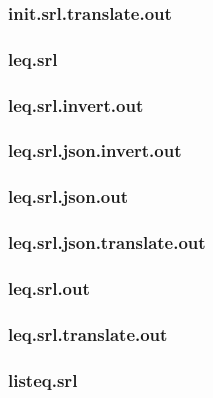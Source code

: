 \subsubsection{init.srl.translate.out}
\label{app:init_srl.translate.out}

\subsubsection{leq.srl}
\label{app:leq_srl}

\subsubsection{leq.srl.invert.out}
\label{app:leq_srl.invert.out}

\subsubsection{leq.srl.json.invert.out}
\label{app:leq_srl.json.invert.out}

\subsubsection{leq.srl.json.out}
\label{app:leq_srl.json.out}

\subsubsection{leq.srl.json.translate.out}
\label{app:leq_srl.json.translate.out}

\subsubsection{leq.srl.out}
\label{app:leq_srl.out}

\subsubsection{leq.srl.translate.out}
\label{app:leq_srl.translate.out}

\subsubsection{listeq.srl}
\label{app:listeq_srl}

